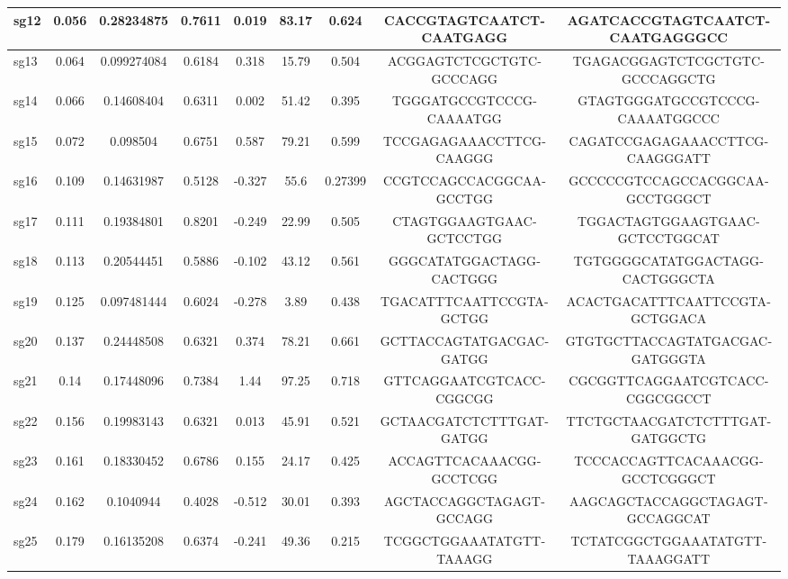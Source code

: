 \documentclass[12pt,a4paper,BCOR=.7cm,headsepline,bibliography=totoc]{report}
\begin{document}
\begin{table}[H]
\begin{latin}
\begin{adjustbox}{center}
{\begin{tabularx}{2.08\textwidth}{|l|c|c|c|c|c|c|c|c|}
	sg12 & 0.056 & 0.28234875 & 0.7611 & 0.019 & 83.17 & 0.624 & CACCGTAGTCAATCTCAATGAGG & AGATCACCGTAGTCAATCTCAATGAGGGCC \\ \hline
	sg13 & 0.064 & 0.099274084 & 0.6184 & 0.318 & 15.79 & 0.504 & ACGGAGTCTCGCTGTCGCCCAGG & TGAGACGGAGTCTCGCTGTCGCCCAGGCTG \\ \hline
	sg14 & 0.066 & 0.14608404 & 0.6311 & 0.002 & 51.42 & 0.395 & TGGGATGCCGTCCCGCAAAATGG & GTAGTGGGATGCCGTCCCGCAAAATGGCCC \\ \hline
	sg15 & 0.072 & 0.098504 & 0.6751 & 0.587 & 79.21 & 0.599& TCCGAGAGAAACCTTCGCAAGGG & CAGATCCGAGAGAAACCTTCGCAAGGGATT \\ \hline
	sg16 & 0.109 & 0.14631987 & 0.5128 & -0.327 & 55.6 & 0.27399 & CCGTCCAGCCACGGCAAGCCTGG & GCCCCCGTCCAGCCACGGCAAGCCTGGGCT \\ \hline
	sg17 & 0.111 & 0.19384801 & 0.8201 & -0.249 & 22.99 & 0.505 & CTAGTGGAAGTGAACGCTCCTGG & TGGACTAGTGGAAGTGAACGCTCCTGGCAT \\ \hline
	sg18 & 0.113 & 0.20544451 & 0.5886 & -0.102 & 43.12 & 0.561 & GGGCATATGGACTAGGCACTGGG & TGTGGGGCATATGGACTAGGCACTGGGCTA \\ \hline
	sg19 & 0.125 & 0.097481444 & 0.6024 & -0.278 & 3.89 & 0.438 & TGACATTTCAATTCCGTAGCTGG & ACACTGACATTTCAATTCCGTAGCTGGACA \\ \hline
	sg20 & 0.137 & 0.24448508 & 0.6321 & 0.374 & 78.21 & 0.661& GCTTACCAGTATGACGACGATGG & GTGTGCTTACCAGTATGACGACGATGGGTA \\ \hline
	sg21 & 0.14 & 0.17448096 & 0.7384 & 1.44 & 97.25 & 0.718 & GTTCAGGAATCGTCACCCGGCGG & CGCGGTTCAGGAATCGTCACCCGGCGGCCT \\ \hline
	sg22 & 0.156 & 0.19983143 & 0.6321 & 0.013 & 45.91 & 0.521 & GCTAACGATCTCTTTGATGATGG & TTCTGCTAACGATCTCTTTGATGATGGCTG \\ \hline
	sg23 & 0.161 & 0.18330452 & 0.6786 & 0.155 & 24.17 & 0.425 & ACCAGTTCACAAACGGGCCTCGG & TCCCACCAGTTCACAAACGGGCCTCGGGCT \\ \hline
	sg24 & 0.162 & 0.1040944 & 0.4028 & -0.512 & 30.01 & 0.393 & AGCTACCAGGCTAGAGTGCCAGG & AAGCAGCTACCAGGCTAGAGTGCCAGGCAT \\ \hline
	sg25 & 0.179 & 0.16135208 & 0.6374 & -0.241 & 49.36 & 0.215 & TCGGCTGGAAATATGTTTAAAGG & TCTATCGGCTGGAAATATGTTTAAAGGATT \\ \hline
\end{tabularx}}
\end{adjustbox}
\end{latin}
\end{table}
\end{document}
